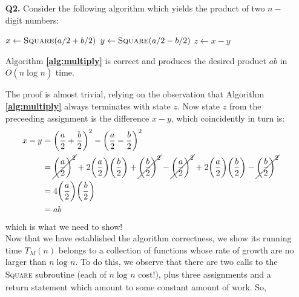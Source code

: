 \documentclass[10pt, letterpaper]{article}
\begin{document}
\begin{enumerate}
  \item[\textbf{Q2.}]
    Consider the following algorithm which yields the product of two $n-$digit numbers:
    \vspace{-6mm}
    \begin{center}
      \begin{minipage}{.99\linewidth}
        \begin{algorithm}[H]
          \caption{$\textsc{multiply}(a,b)$}\label{alg:multiply}
          \begin{algorithmic}
            \State $x \gets \textsc{Square}(a/2+b/2)$
            \State $y \gets \textsc{Square}(a/2-b/2)$
            \State $z \gets x - y$
            \State {}
          \end{algorithmic}
        \end{algorithm}
      \end{minipage}
    \end{center}

    \begin{claim*}
      Algorithm \textbf{\ref{alg:multiply}} is correct and produces the desired product $ab$
      in $O(n\log_{}n)$ time.
    \end{claim*}

    \begin{proof*}
      The proof is almost trivial, relying on the observation that Algorithm \textbf{\ref{alg:multiply}}
      always terminates with state $z$. Now state $z$ from the preceeding assignment is the
      difference $x - y$, which coincidently in turn is:
      \begin{align*}
        x -y 
          &= \bigg(\dfrac{a}{2} + \dfrac{b}{2}\bigg)^2 - \bigg(\dfrac{a}{2} - \dfrac{b}{2}\bigg)^2 \\
          &= \cancel{\bigg(\dfrac{a}{2}\bigg)^2} + 2\bigg(\dfrac{a}{2}\bigg)\bigg(\dfrac{b}{2}\bigg) + \cancel{\bigg(\dfrac{b}{2}\bigg)^2}
             -\cancel{\bigg(\dfrac{a}{2}\bigg)^2} + 2\bigg(\dfrac{a}{2}\bigg)\bigg(\dfrac{b}{2}\bigg) - \cancel{\bigg(\dfrac{b}{2}\bigg)^2} \\
          &= 4\bigg(\dfrac{a}{2}\bigg)\bigg(\dfrac{b}{2}\bigg) \\
          &= ab
      \end{align*}
      which is what we need to show! \\

      Now that we have established the algorithm correctness, we show its running time $T_M(n)$
      belongs to a collection of functions whose rate of growth are no larger than $n\log_{} n$.
      To do this, we observe that there are two calls to the \textsc{Square} subroutine (each of
      $n\log_{}n$ cost!), plus three assignments and a return statement which amount to some constant
      amount of work. So,


\end{proof*}
\end{enumerate}
\end{document}
